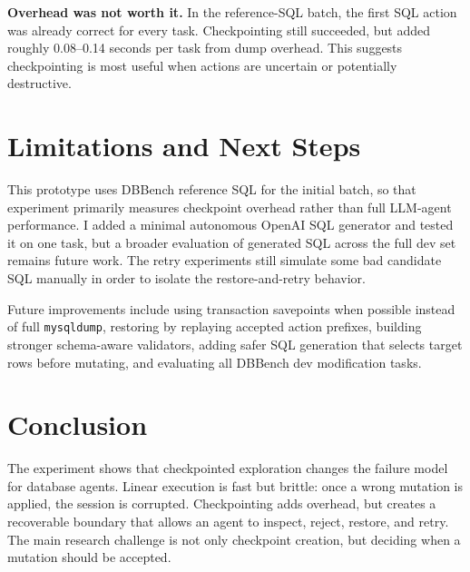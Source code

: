 \documentclass[10pt,twocolumn]{article}
\begin{document}
\textbf{Overhead was not worth it.} In the reference-SQL batch, the first SQL action was already correct for every task. Checkpointing still succeeded, but added roughly 0.08--0.14 seconds per task from dump overhead. This suggests checkpointing is most useful when actions are uncertain or potentially destructive.

\section{Limitations and Next Steps}

This prototype uses DBBench reference SQL for the initial batch, so that experiment primarily measures checkpoint overhead rather than full LLM-agent performance. I added a minimal autonomous OpenAI SQL generator and tested it on one task, but a broader evaluation of generated SQL across the full dev set remains future work. The retry experiments still simulate some bad candidate SQL manually in order to isolate the restore-and-retry behavior.

Future improvements include using transaction savepoints when possible instead of full \texttt{mysqldump}, restoring by replaying accepted action prefixes, building stronger schema-aware validators, adding safer SQL generation that selects target rows before mutating, and evaluating all DBBench dev modification tasks.

\section{Conclusion}

The experiment shows that checkpointed exploration changes the failure model for database agents. Linear execution is fast but brittle: once a wrong mutation is applied, the session is corrupted. Checkpointing adds overhead, but creates a recoverable boundary that allows an agent to inspect, reject, restore, and retry. The main research challenge is not only checkpoint creation, but deciding when a mutation should be accepted.
\end{document}
